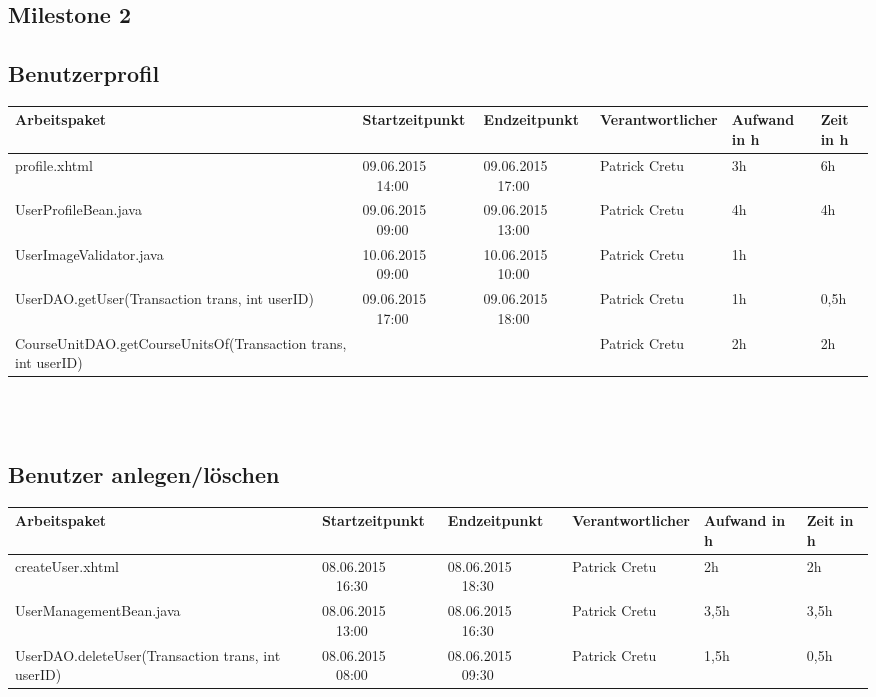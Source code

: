 \begin{landscape}
	\section{Milestone 2}
	
	\subsection{Benutzerprofil}
\begin{tabular}{|p{10.3cm}|p{3.2cm}|p{3.2cm}|p{3.5cm}|p{1.7cm}|p{1.5cm}|}
	\hline  \textbf{Arbeitspaket} & \textbf{Startzeitpunkt} & \textbf{Endzeitpunkt} & \textbf{Verantwortlicher}  & \textbf{Aufwand in h} & \textbf{Zeit in h}\\ 
		\hline   profile.xhtml                                         & 09.06.2015 \ \ 14:00        & 09.06.2015 \ \ 17:00        & Patrick Cretu  &  3h      & 6h\\ 
		\hline   UserProfileBean.java                                  & 09.06.2015 \ \ 09:00        & 09.06.2015 \ \ 13:00        & Patrick Cretu  &  4h      & 4h \\ 
		\hline   UserImageValidator.java                               & 10.06.2015 \ \ 09:00        & 10.06.2015 \ \ 10:00        & Patrick Cretu  &  1h      &    \\ 
		\hline   UserDAO.getUser(Transaction trans, int userID)        & 09.06.2015 \ \ 17:00        & 09.06.2015 \ \ 18:00        & Patrick Cretu  &  1h      & 0,5h\\  
		\hline   CourseUnitDAO.getCourseUnitsOf(Transaction trans, int userID)  &         &     & Patrick Cretu & 2h& 2h\\ 
		\hline 
	\end{tabular} \ \\
	\ \\
	
	\subsection{Benutzer anlegen/löschen}
	\begin{tabular}{|p{10.3cm}|p{3.2cm}|p{3.2cm}|p{3.5cm}|p{1.7cm}|p{1.5cm}|}
		\hline  \textbf{Arbeitspaket} & \textbf{Startzeitpunkt} & \textbf{Endzeitpunkt} & \textbf{Verantwortlicher}  & \textbf{Aufwand in h} & \textbf{Zeit in h}\\ 
		\hline   createUser.xhtml                                      & 08.06.2015 \ \ 16:30        & 08.06.2015 \ \ 18:30        &  Patrick Cretu &  2h       & 2h\\ 
		\hline   UserManagementBean.java                               & 08.06.2015 \ \ 13:00        & 08.06.2015 \ \ 16:30        &  Patrick Cretu	&  3,5h     & 3,5h\\ 
		\hline   UserDAO.deleteUser(Transaction trans, int userID)     & 08.06.2015 \ \ 08:00        & 08.06.2015 \ \ 09:30        &  Patrick Cretu &  1,5h     & 0,5h\\ 
		\hline 
	\end{tabular} \ \\
	\ \\
	

\end{landscape}
